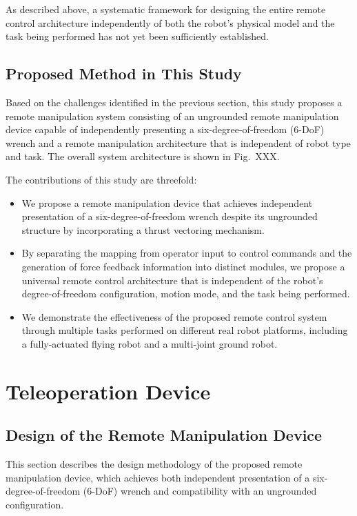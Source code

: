 \documentclass{WileyMSP-template}
\begin{document}
As described above, a systematic framework for designing the entire remote control architecture independently of both the robot’s physical model and the task being performed has not yet been sufficiently established.

\subsection{Proposed Method in This Study}

Based on the challenges identified in the previous section, this study proposes a remote manipulation system consisting of an ungrounded remote manipulation device capable of independently presenting a six-degree-of-freedom (6-DoF) wrench and a remote manipulation architecture that is independent of robot type and task.
The overall system architecture is shown in Fig.~XXX.

The contributions of this study are threefold:

\begin{itemize}
\item We propose a remote manipulation device that achieves independent presentation of a six-degree-of-freedom wrench despite its ungrounded structure by incorporating a thrust vectoring mechanism.

\item By separating the mapping from operator input to control commands and the generation of force feedback information into distinct modules, we propose a universal remote control architecture that is independent of the robot’s degree-of-freedom configuration, motion mode, and the task being performed.

\item We demonstrate the effectiveness of the proposed remote control system through multiple tasks performed on different real robot platforms, including a fully-actuated flying robot and a multi-joint ground robot.
\end{itemize}

\section{Teleoperation Device}\label{sec:teleop_device}

\subsection{Design of the Remote Manipulation Device}\label{sec:device_hardware}
This section describes the design methodology of the proposed remote manipulation device, which achieves both independent presentation of a six-degree-of-freedom (6-DoF) wrench and compatibility with an ungrounded configuration. %
\end{document}
